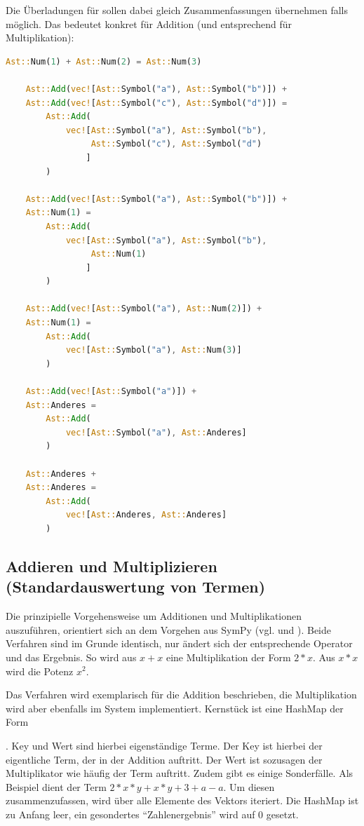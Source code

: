 \documentclass[11pt,a4paper, ngerman]{article}
\begin{document}
Die Überladungen für  sollen dabei gleich Zusammenfassungen übernehmen falls möglich. Das bedeutet konkret für Addition (und entsprechend für Multiplikation):

\begin{lstlisting}[language=rust, caption={smarte Operatenüberladung}]
    Ast::Num(1) + Ast::Num(2) = Ast::Num(3)

    Ast::Add(vec![Ast::Symbol("a"), Ast::Symbol("b")]) +
    Ast::Add(vec![Ast::Symbol("c"), Ast::Symbol("d")]) = 
        Ast::Add(
            vec![Ast::Symbol("a"), Ast::Symbol("b"), 
                 Ast::Symbol("c"), Ast::Symbol("d")
                ]
        )

    Ast::Add(vec![Ast::Symbol("a"), Ast::Symbol("b")]) +
    Ast::Num(1) =
        Ast::Add(
            vec![Ast::Symbol("a"), Ast::Symbol("b"), 
                 Ast::Num(1)
                ]
        )

    Ast::Add(vec![Ast::Symbol("a"), Ast::Num(2)]) +
    Ast::Num(1) =
        Ast::Add(
            vec![Ast::Symbol("a"), Ast::Num(3)]
        )

    Ast::Add(vec![Ast::Symbol("a")]) +
    Ast::Anderes =
        Ast::Add(
            vec![Ast::Symbol("a"), Ast::Anderes]
        )

    Ast::Anderes +
    Ast::Anderes =
        Ast::Add(
            vec![Ast::Anderes, Ast::Anderes]
        )
\end{lstlisting}

\label{sec:kapAddnundMult}
\subsection{Addieren und Multiplizieren (Standardauswertung von Termen)}
Die prinzipielle Vorgehensweise um Additionen und Multiplikationen auszuführen, orientiert sich an dem Vorgehen aus SymPy (vgl. \cite{SymPyAddFlatten} und \cite{SymPyMulFlatten}). Beide Verfahren sind im Grunde identisch, nur ändert sich der entsprechende Operator und das Ergebnis. So wird aus $x+x$ eine Multiplikation der Form $2*x$. Aus $x*x$ wird die Potenz $x^2$. 

Das Verfahren wird exemplarisch für die Addition beschrieben, die Multiplikation wird aber ebenfalls im System implementiert. Kernstück ist eine HashMap der Form

. Key und Wert sind hierbei eigenständige Terme. Der Key ist hierbei der eigentliche Term, der in der Addition auftritt. Der Wert ist sozusagen der Multiplikator wie häufig der Term auftritt. Zudem gibt es einige Sonderfälle. Als Beispiel dient der Term 
$2*x*y + x*y + 3 + a - a$. Um diesen zusammenzufassen, wird über alle Elemente des Vektors iteriert. Die HashMap ist zu Anfang leer, ein gesondertes ``Zahlenergebnis'' wird auf 0 gesetzt.
\end{document}
